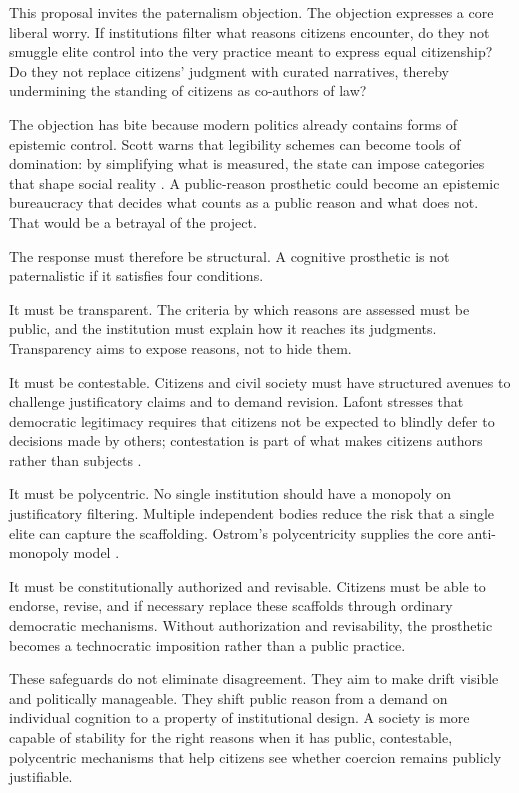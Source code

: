 \documentclass[12pt]{article}
\begin{document}
This proposal invites the paternalism objection. The objection expresses a core liberal worry. If institutions filter what reasons citizens encounter, do they not smuggle elite control into the very practice meant to express equal citizenship? Do they not replace citizens' judgment with curated narratives, thereby undermining the standing of citizens as co-authors of law?

The objection has bite because modern politics already contains forms of epistemic control. Scott warns that legibility schemes can become tools of domination: by simplifying what is measured, the state can impose categories that shape social reality \parencite[p.~309]{scott1998seeing}. A public-reason prosthetic could become an epistemic bureaucracy that decides what counts as a public reason and what does not. That would be a betrayal of the project.

The response must therefore be structural. A cognitive prosthetic is not paternalistic if it satisfies four conditions.

It must be transparent. The criteria by which reasons are assessed must be public, and the institution must explain how it reaches its judgments. Transparency aims to expose reasons, not to hide them.

It must be contestable. Citizens and civil society must have structured avenues to challenge justificatory claims and to demand revision. Lafont stresses that democratic legitimacy requires that citizens not be expected to blindly defer to decisions made by others; contestation is part of what makes citizens authors rather than subjects \parencite[p.~3]{lafont2020democracy}.

It must be polycentric. No single institution should have a monopoly on justificatory filtering. Multiple independent bodies reduce the risk that a single elite can capture the scaffolding. Ostrom's polycentricity supplies the core anti-monopoly model \parencite[pp.~644--645]{ostrom2010polycentric}.

It must be constitutionally authorized and revisable. Citizens must be able to endorse, revise, and if necessary replace these scaffolds through ordinary democratic mechanisms. Without authorization and revisability, the prosthetic becomes a technocratic imposition rather than a public practice.

These safeguards do not eliminate disagreement. They aim to make drift visible and politically manageable. They shift public reason from a demand on individual cognition to a property of institutional design. A society is more capable of stability for the right reasons when it has public, contestable, polycentric mechanisms that help citizens see whether coercion remains publicly justifiable.
\end{document}
